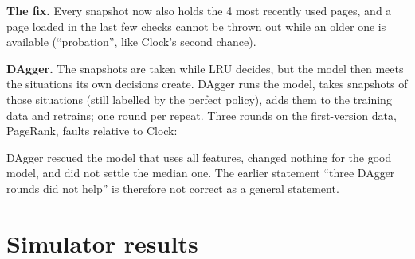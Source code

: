 \documentclass[10.5pt,a4paper]{article}
\begin{document}
\textbf{The fix.} Every snapshot now also holds the 4 most recently used pages, and a page loaded in the last few checks cannot be thrown out while an older one is available (``probation'', like Clock's second chance).

\textbf{DAgger.} The snapshots are taken while LRU decides, but the model then meets the situations its own decisions create. DAgger runs the model, takes snapshots of those situations (still labelled by the perfect policy),
adds them to the training data and retrains; one round per repeat. Three rounds on the first-version data, PageRank, faults relative to Clock:

\begin{center}\small

\end{center}

DAgger rescued the model that uses all features, changed nothing for the good model, and did not settle the median one. The earlier statement ``three DAgger rounds did not help'' is therefore not correct as a general statement.

\section{Simulator results}
\label{app:sim}

\begin{table}[h]
\centering\tiny

\caption{Faults relative to Clock in the simulator on the training workloads' test and held-out streams: classical policies, the linear model, trees and networks over kernel-visible features (K) and with features only a simulator can see (FK), and Belady (the best possible).}
\end{table}

\begin{table}[h]
\centering\scriptsize

\caption{Faults relative to Clock per stream group on workloads no model was trained on (simulator, geometric mean over streams and the three memory sizes).}
\end{table}

\begin{table}[h]
\centering\scriptsize

\caption{LeCaR in the simulator. ``As published'': advisers exact LRU and exact LFU (needs every access, so a kernel cannot run it). ``Kernel form'': Clock and the kernel's ``how often used'' count, read at evictions. Original parameters (learning rate 0.45, history of half the memory per adviser).}
\end{table}
\end{document}
